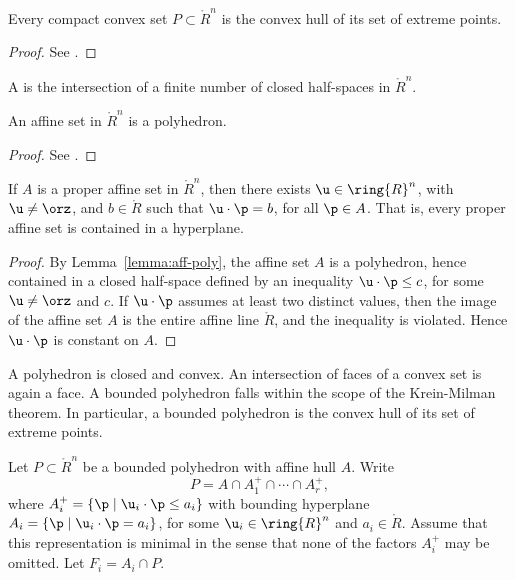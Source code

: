 \begin{lemma} Every compact
convex set $P\subset\ring{R}^n$ is the convex hull of its set of
extreme points.
\end{lemma}

\begin{proof}  See \cite[Theorem~2.6.16]{webster:1994}.
\end{proof}


\begin{definition}[polyhedron]
A  is the
intersection of a finite number of closed half-spaces in
$\ring{R}^n$.  
\end{definition}
%

\begin{lemma}[]\label{lemma:aff-poly}
An affine set in $\ring{R}^n$ is a polyhedron.
\end{lemma}

\begin{proof} See \cite[Cor~1.4.2]{webster:1994}.
\end{proof}

\begin{lemma}[]\label{lemma:aff-u}
If $A$ is a proper affine set in $\ring{R}^n$, then there exists $\u\in \ring{R}^n$, with
$\u\ne\orz$, and $b\in\ring{R}$ 
such that $\u\cdot\p = b$, for all $\p\in A$.  That is, every proper affine set
is contained in a hyperplane.
\end{lemma}

\begin{proof}
By Lemma~\ref{lemma:aff-poly},
the affine set $A$ is a polyhedron, hence contained in a closed half-space defined by an
inequality $\u\cdot\p \le c$, for some $\u\ne \orz$ and $c$.  If $\u\cdot\p$ assumes
at least two distinct values, then the image of the affine set $A$ 
is the entire affine line $\ring{R}$, and the inequality is violated.
Hence $\u\cdot\p$ is constant on $A$.
\end{proof}

A polyhedron is closed and convex.  An intersection of faces of a
convex set is again a face.  A bounded polyhedron falls within the
scope of the Krein-Milman theorem.  In particular, a bounded
polyhedron is the convex hull of its set of extreme points.
%

Let $P\subset\ring{R}^n$ be a bounded polyhedron with affine hull
$A$. Write
\begin{equation}\label{eqn:polyrep}
P = A \cap A^+_1 \cap \cdots \cap A^+_r,
\end{equation}
where $A^+_i = \{\p\mid \u_i\cdot \p \le a_i\}$ with bounding
hyperplane $A_i=\{\p\mid \u_i \cdot \p = a_i\}$, for some $\u_i\in
\ring{R}^n$ and $a_i\in\ring{R}$.  Assume that this representation is
minimal in the sense that none of the factors $A^+_i$ may be omitted.
Let $F_i = A_i\cap P$.  %


